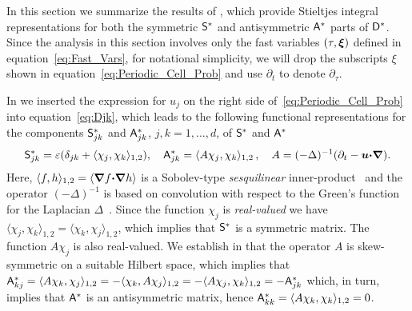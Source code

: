 \documentclass[amsa]{ipart}
\begin{document}
In this section we summarize the results of
, which provide 
Stieltjes integral representations for both the symmetric $\mathsf{S}^*$ and
antisymmetric $\mathsf{A}^*$ parts of $\mathsf{D}^*$. Since the analysis in this 
section involves only the fast variables $(\tau,\boldsymbol{\xi})$ defined
in equation~\eqref{eq:Fast_Vars}, for notational simplicity,
we will drop the subscripts $\xi$ shown in
equation~\eqref{eq:Periodic_Cell_Prob} and use $\partial_t$ to denote $\partial_\tau$.




In  we inserted the expression for $u_j$ on
the right side of~\eqref{eq:Periodic_Cell_Prob}
into equation~\eqref{eq:Djk}, which leads to the following functional
representations for the components $\mathsf{S}^*_{jk}$ and $\mathsf{A}^*_{jk}$,
$j,k=1,\ldots,d$, of $\mathsf{S}^*$ and $\mathsf{A}^*$~\cite{Pavliotis:PHD_Thesis}      
%
\begin{align}\label{eq:Eff_Diffusivity_Sobolev}
  \Sm^*_{jk}=\varepsilon(\delta_{jk}+\langle\chi_j,\chi_k\rangle_{1,2}),
  \quad
  \Am^*_{jk}=\langle A\chi_j,\chi_k\rangle_{1,2}\,,
  \quad
  A=(-\Delta)^{-1}(\partial_t-\vecu \bcdot\bnabla).
\end{align}
%
Here, $\langle f,h\rangle_{1,2}=\langle\mbox{\boldmath${\nabla}$} f\mbox{\boldmath${\cdot}$}\mbox{\boldmath${\nabla}$} h\rangle$ is a Sobolev-type
\emph{sesquilinear} inner-product~\cite{McOwen:2003:PDE} and the
operator $(-\Delta)^{-1}$ is based on convolution with respect to the
Green's function for the Laplacian $\Delta$~\cite{Stakgold:BVP:2000}. 
Since the function $\chi_j$ is
\emph{real-valued} we have $\langle\chi_j,\chi_k\rangle_{1,2}=\langle\chi_k,\chi_j\rangle_{1,2}$, which implies that
$\mathsf{S}^*$ is a symmetric matrix. The function $A\chi_j$ is also
real-valued. We establish in  that the
operator $A$ is skew-symmetric on a suitable Hilbert space, which
implies that
$\mathsf{A}^*_{kj}=\langle A\chi_k,\chi_j\rangle_{1,2}=-\langle\chi_k,A\chi_j\rangle_{1,2}=-\langle A\chi_j,\chi_k\rangle_{1,2}=-\mathsf{A}^*_{jk}$
which, in turn, implies that $\mathsf{A}^*$ is an antisymmetric matrix, hence
$\mathsf{A}^*_{kk}=\langle A\chi_k,\chi_k\rangle_{1,2}=0$.  
\end{document}

